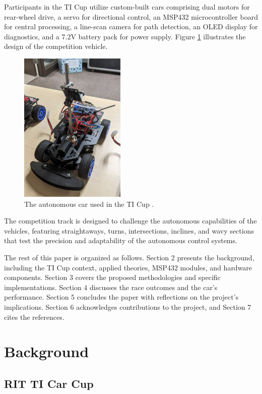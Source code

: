 \documentclass[conference]{IEEEtran}
\begin{document}
Participants in the TI Cup utilize custom-built cars comprising dual motors for rear-wheel drive, a servo for directional control, an MSP432 microcontroller board for central processing, a line-scan camera for path detection, an OLED display for diagnostics, and a 7.2V battery pack for power supply. Figure \ref{fig:car} illustrates the design of the competition vehicle.

\begin{figure}[htbp]
	\centerline{\includegraphics[width=0.45\textwidth]{images/car.png}}
	\caption{The autonomous car used in the TI Cup \cite{carCup2022}.}
	\label{fig:car}
\end{figure}

The competition track is designed to challenge the autonomous capabilities of the vehicles, featuring straightaways, turns, intersections, inclines, and wavy sections that test the precision and adaptability of the autonomous control systems.

The rest of this paper is organized as follows. Section 2 presents the background, including the TI Cup context, applied theories, MSP432 modules, and hardware components. Section 3 covers the proposed methodologies and specific implementations. Section 4 discusses the race outcomes and the car's performance. Section 5 concludes the paper with reflections on the project's implications. Section 6 acknowledges contributions to the project, and Section 7 cites the references.

\section{Background}

\subsection{RIT TI Car Cup}
\end{document}
